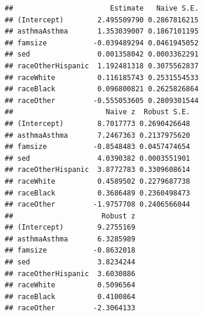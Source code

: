 \documentclass[]{tufte-book}
\newenvironment{Shaded}{}{}
\newcommand{\KeywordTok}[1]{\textcolor[rgb]{0.00,0.44,0.13}{\textbf{#1}}}
\newcommand{\DataTypeTok}[1]{\textcolor[rgb]{0.56,0.13,0.00}{#1}}
\newcommand{\StringTok}[1]{\textcolor[rgb]{0.25,0.44,0.63}{#1}}
\newcommand{\OperatorTok}[1]{\textcolor[rgb]{0.40,0.40,0.40}{#1}}
\newcommand{\NormalTok}[1]{#1}
\theoremstyle{definition}
\theoremstyle{definition}
\theoremstyle{remark}
\begin{document}
\begin{verbatim}
##                       Estimate   Naive S.E.
## (Intercept)        2.495509790 0.2867816215
## asthmaAsthma       1.353039007 0.1867101195
## famsize           -0.039489294 0.0461945052
## sed                0.001358042 0.0003362291
## raceOtherHispanic  1.192481318 0.3075562837
## raceWhite          0.116185743 0.2531554533
## raceBlack          0.096800821 0.2625826864
## raceOther         -0.555053605 0.2809301544
##                      Naive z  Robust S.E.
## (Intercept)        8.7017773 0.2690426648
## asthmaAsthma       7.2467363 0.2137975620
## famsize           -0.8548483 0.0457474654
## sed                4.0390382 0.0003551901
## raceOtherHispanic  3.8772783 0.3309608614
## raceWhite          0.4589502 0.2279687738
## raceBlack          0.3686489 0.2360498473
## raceOther         -1.9757708 0.2406566044
##                     Robust z
## (Intercept)        9.2755169
## asthmaAsthma       6.3285989
## famsize           -0.8632018
## sed                3.8234244
## raceOtherHispanic  3.6030886
## raceWhite          0.5096564
## raceBlack          0.4100864
## raceOther         -2.3064133
\end{verbatim}

\begin{Shaded}
\end{Shaded}
\end{document}
